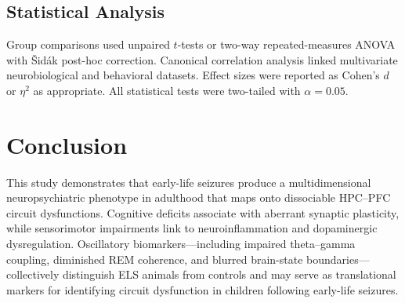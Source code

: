 \documentclass[11pt]{article}
\begin{document}
\subsection{Statistical Analysis}

Group comparisons used unpaired $t$-tests or two-way repeated-measures ANOVA with \v{S}id\'{a}k post-hoc correction. Canonical correlation analysis linked multivariate neurobiological and behavioral datasets. Effect sizes were reported as Cohen's $d$ or $\eta^2$ as appropriate. All statistical tests were two-tailed with $\alpha = 0.05$.

\section{Conclusion}

This study demonstrates that early-life seizures produce a multidimensional neuropsychiatric phenotype in adulthood that maps onto dissociable HPC--PFC circuit dysfunctions. Cognitive deficits associate with aberrant synaptic plasticity, while sensorimotor impairments link to neuroinflammation and dopaminergic dysregulation. Oscillatory biomarkers---including impaired theta--gamma coupling, diminished REM coherence, and blurred brain-state boundaries---collectively distinguish ELS animals from controls and may serve as translational markers for identifying circuit dysfunction in children following early-life seizures.



\end{document}
